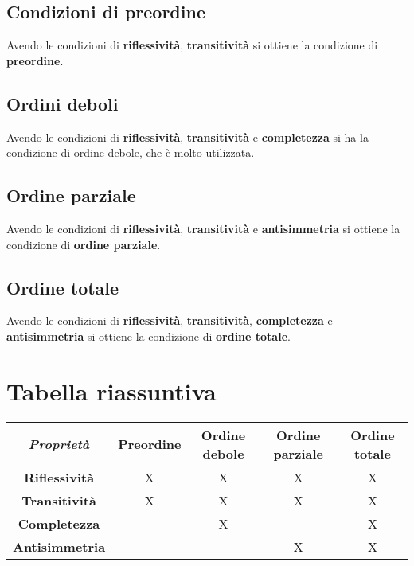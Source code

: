 \documentclass[\main/main.tex]{subfiles}
\begin{document}
\subsection{Condizioni di preordine}
Avendo le condizioni di \textbf{riflessività}, \textbf{transitività} si ottiene la condizione di \textbf{preordine}.

\subsection{Ordini deboli}
Avendo le condizioni di \textbf{riflessività}, \textbf{transitività} e \textbf{completezza} si ha la condizione di ordine debole, che è molto utilizzata.

\subsection{Ordine parziale}
Avendo le condizioni di \textbf{riflessività}, \textbf{transitività} e \textbf{antisimmetria} si ottiene la condizione di \textbf{ordine parziale}.

\subsection{Ordine totale}
Avendo le condizioni di \textbf{riflessività}, \textbf{transitività}, \textbf{completezza} e \textbf{antisimmetria} si ottiene la condizione di \textbf{ordine totale}.

\section{Tabella riassuntiva}
\begin{center}
	\begin{tabular}{|c|c|c|c|c|}
		\hline
		\textit{Proprietà}     & \textbf{Preordine} & \textbf{Ordine debole} & \textbf{Ordine parziale} & \textbf{Ordine totale} \\
		\hline
		\textbf{Riflessività}  & X                  & X                      & X                        & X                      \\
		\hline
		\textbf{Transitività}  & X                  & X                      & X                        & X                      \\
		\hline
		\textbf{Completezza}   &                    & X                      &                          & X                      \\
		\hline
		\textbf{Antisimmetria} &                    &                        & X                        & X                      \\
		\hline
	\end{tabular}
\end{center}
\end{document}
